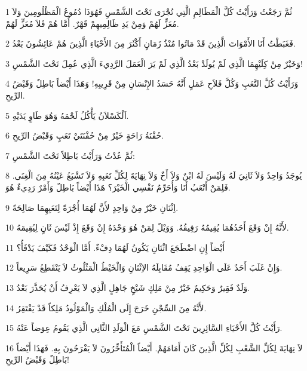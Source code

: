 \par 1 ثُمَّ رَجَعْتُ وَرَأَيْتُ كُلَّ الْمَظَالِمِ الَّتِي تُجْرَى تَحْتَ الشَّمْسِ فَهُوَذَا دُمُوعُ الْمَظْلُومِينَ وَلاَ مُعَزٍّ لَهُمْ وَمِنْ يَدِ ظَالِمِيهِمْ قَهْرٌ. أَمَّا هُمْ فَلاَ مُعَزٍّ لَهُمْ.
\par 2 فَغَبَطْتُ أَنَا الأَمْوَاتَ الَّذِينَ قَدْ مَاتُوا مُنْذُ زَمَانٍ أَكْثَرَ مِنَ الأَحْيَاءِ الَّذِينَ هُمْ عَائِشُونَ بَعْدُ.
\par 3 وَخَيْرٌ مِنْ كِلَيْهِمَا الَّذِي لَمْ يُولَدْ بَعْدُ الَّذِي لَمْ يَرَ الْعَمَلَ الرَّدِيءَ الَّذِي عُمِلَ تَحْتَ الشَّمْسِ!
\par 4 وَرَأَيْتُ كُلَّ التَّعَبِ وَكُلَّ فَلاَحِ عَمَلٍ أَنَّهُ حَسَدُ الإِنْسَانِ مِنْ قَرِيبِهِ! وَهَذَا أَيْضاً بَاطِلٌ وَقَبْضُ الرِّيحِ.
\par 5 اَلْكَسْلاَنُ يَأْكُلُ لَحْمَهُ وَهُوَ طَاوٍ يَدَيْهِ.
\par 6 حُفْنَةُ رَاحَةٍ خَيْرٌ مِنْ حُفْنَتَيْ تَعَبٍ وَقَبْضُ الرِّيحِ.
\par 7 ثُمَّ عُدْتُ وَرَأَيْتُ بَاطِلاً تَحْتَ الشَّمْسِ:
\par 8 يُوجَدُ وَاحِدٌ وَلاَ ثَانِيَ لَهُ وَلَيْسَ لَهُ ابْنٌ وَلاَ أَخٌ وَلاَ نِهَايَةَ لِكُلِّ تَعَبِهِ وَلاَ تَشْبَعُ عَيْنُهُ مِنَ الْغِنَى. فَلِمَنْ أَتْعَبُ أَنَا وَأُحَرِّمُ نَفْسِي الْخَيْرَ؟ هَذَا أَيْضاً بَاطِلٌ وَأَمْرٌ رَدِيءٌ هُوَ.
\par 9 اِثْنَانِ خَيْرٌ مِنْ وَاحِدٍ لأَنَّ لَهُمَا أُجْرَةً لِتَعَبِهِمَا صَالِحَةً.
\par 10 لأَنَّهُ إِنْ وَقَعَ أَحَدُهُمَا يُقِيمُهُ رَفِيقُهُ. وَوَيْلٌ لِمَنْ هُوَ وَحْدَهُ إِنْ وَقَعَ إِذْ لَيْسَ ثَانٍ لِيُقِيمَهُ.
\par 11 أَيْضاً إِنِ اضْطَجَعَ اثْنَانِ يَكُونُ لَهُمَا دِفْءٌ. أَمَّا الْوَحْدُ فَكَيْفَ يَدْفَأُ؟
\par 12 وَإِنْ غَلَبَ أَحَدٌ عَلَى الْوَاحِدِ يَقِفُ مُقَابِلَهُ الاِثْنَانِ وَالْخَيْطُ الْمَثْلُوثُ لاَ يَنْقَطِعُ سَرِيعاً.
\par 13 وَلَدٌ فَقِيرٌ وَحَكِيمٌ خَيْرٌ مِنْ مَلِكٍ شَيْخٍ جَاهِلٍ الَّذِي لاَ يَعْرِفُ أَنْ يُحَذَّرَ بَعْدُ.
\par 14 لأَنَّهُ مِنَ السِّجْنِ خَرَجَ إِلَى الْمُلْكِ وَالْمَوْلُودُ مَلِكاً قَدْ يَفْتَقِرُ.
\par 15 رَأَيْتُ كُلَّ الأَحْيَاءِ السَّائِرِينَ تَحْتَ الشَّمْسِ مَعَ الْوَلَدِ الثَّانِي الَّذِي يَقُومُ عِوَضاً عَنْهُ.
\par 16 لاَ نِهَايَةَ لِكُلِّ الشَّعْبِ لِكُلِّ الَّذِينَ كَانَ أَمَامَهُمْ. أَيْضاً الْمُتَأَخِّرُونَ لاَ يَفْرَحُونَ بِهِ. فَهَذَا أَيْضاً بَاطِلٌ وَقَبْضُ الرِّيحِ!

